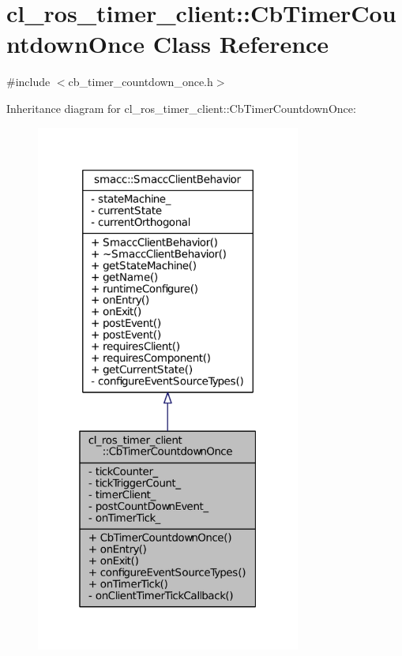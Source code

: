\hypertarget{classcl__ros__timer__client_1_1CbTimerCountdownOnce}{}\section{cl\+\_\+ros\+\_\+timer\+\_\+client\+:\+:Cb\+Timer\+Countdown\+Once Class Reference}
\label{classcl__ros__timer__client_1_1CbTimerCountdownOnce}


{\ttfamily \#include $<$cb\+\_\+timer\+\_\+countdown\+\_\+once.\+h$>$}



Inheritance diagram for cl\+\_\+ros\+\_\+timer\+\_\+client\+:\+:Cb\+Timer\+Countdown\+Once\+:
\nopagebreak
\begin{figure}[H]
\begin{center}
\leavevmode
\includegraphics[width=247pt]{classcl__ros__timer__client_1_1CbTimerCountdownOnce__inherit__graph}
\end{center}
\end{figure}


